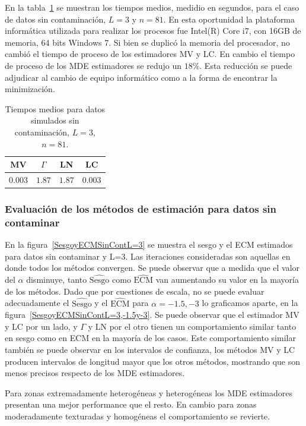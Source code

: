En la tabla~\ref{tablaDeTiemposmediosMVyGAyLNyLC} se muestran los tiempos medios, medidio en segundos, para el caso de datos sin contaminación, $L=3$ y $n=81$. En esta oportunidad la plataforma informática utilizada para realizar los procesos fue Intel(R) Core i7, con 16GB de memoria, 64 bits Windows 7. Si bien se duplicó la memoria del procesador, no cambió el tiempo de proceso de los estimadores MV y LC. En cambio el tiempo de proceso de los MDE estimadores se redujo un $18\%$. Esta reducción se puede adjudicar al cambio de equipo informático como a la forma de encontrar la minimización.

\begin{table}[htb]
	\centering
	\begin{tabular}{cccc}
		\toprule
		MV& $\Gamma$ & LN & LC \\
		\midrule
		$0.003$& $1.87$ & $1.87$ &$0.003$ \\
		\bottomrule
	\end{tabular}
	\caption{\label{tablaDeTiemposmediosMVyGAyLNyLC}\small Tiempos medios para datos simulados sin contaminación, $L=3$, $n=81$. }
\end{table}

\subsubsection{Evaluación de los métodos de estimación para datos sin contaminar}

En la figura~\ref{SesgoyECMSinContL=3} se muestra el sesgo y el ECM estimados para datos sin contaminar y L=3. Las iteraciones consideradas son aquellas en donde todos los métodos convergen. Se puede observar que  a medida que el valor del $\alpha$ disminuye, tanto $\widehat{\text{Sesgo}}$ como $\widehat{\text{ECM}}$ van aumentando su valor en la mayoría de los métodos. Dado que por cuestiones de escala, no se puede evaluar adecuadamente el $\widehat{\text{Sesgo}}$ y el $\widehat{\text{ECM}}$ para $\alpha=-1.5, -3$ lo graficamos aparte, en la figura~\ref{SesgoyECMSinContL=3,-1.5y-3}. Se puede observar que el estimador MV y LC por un lado, y $\Gamma$ y LN por el otro tienen un comportamiento similar tanto en sesgo como en ECM en la mayoría de los casos. Este comportamiento similar también se puede observar en los intervalos de confianza, los métodos MV y LC producen intervalos de longitud mayor que los otros métodos, mostrando que son menos precisos respecto de los MDE estimadores.

 Para zonas extremadamente heterogéneas y heterogéneas los MDE estimadores presentan una mejor performance que el resto. En cambio para zonas moderadamente texturadas y homogéneas el comportamiento se revierte.


